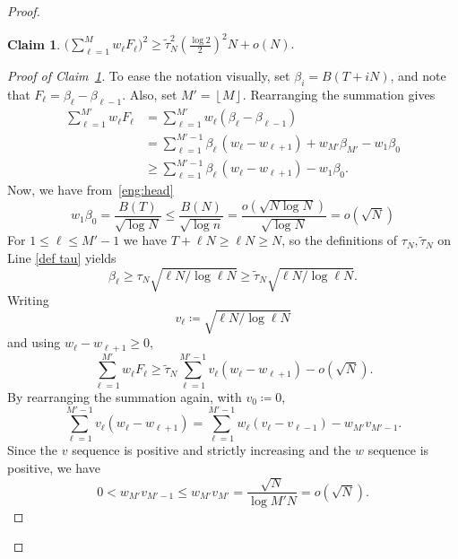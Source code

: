 \documentclass[10pt]{article}
\newcommand{\floor}[1]{\mbox{$\left\lfloor #1 \right\rfloor$}}
\newtheorem{claim}[thm]{Claim}
\begin{document}
\begin{proof}
\begin{claim}\label{eq:num}
    \(\displaystyle \bigg(\sum_{\ell=1}^{M}w_\ell F_\ell\bigg)^{2} \ge \widetilde{\tau}_N^2\left(\frac{\log 2}{2}\right)^2 N+ o(N).\)
\end{claim}
\begin{proof}[Proof of Claim~\ref{eq:num}]
To ease the notation visually, set $\beta_i=B(T+iN)$, and note that $F_\ell = \beta_\ell - \beta_{\ell-1}$. Also, set $M'=\floor{M}$. Rearranging the summation gives
\begin{align*}
   \sum_{\ell=1}^{M'}w_\ell F_\ell
   &=\sum_{\ell=1}^{M'}w_\ell(\beta_\ell-\beta_{\ell-1})\\
   &=\sum_{\ell=1}^{M'-1}\beta_\ell\,(w_\ell-w_{\ell+1})+w_{M'} \beta_{M'}-w_1\beta_0 \\
   &\ge\sum_{\ell=1}^{M'-1}\beta_\ell\,(w_\ell-w_{\ell+1})-w_1\beta_0.
\end{align*}
Now, we have from~\ref{eng:head}
    \[w_1\beta_0=\frac{B(T)}{\sqrt{\log N}}\le \frac{B(N)}{\sqrt{\log n}} = \frac{o(\sqrt{N \log N})}{\sqrt{\log N}} =o(\sqrt N)\]
For $1\le\ell\le M'-1$ we have 
$T+\ell N\ge\ell N\ge N$, so the definitions of $\tau_N,\widetilde{\tau}_N$ on Line \eqref{def tau} yields
  \[\beta_\ell\ge\tau_N \sqrt{\ell N/\log \ell N}  \ge \widetilde{\tau}_N \sqrt{\ell N/\log \ell N} .\] 
Writing 
    \[v_\ell\coloneqq \sqrt{\ell N/\log \ell N}\] 
and using $w_\ell-w_{\ell+1}\ge0$,
\[
   \sum_{\ell=1}^{M'}w_\ell F_\ell
   \ge\widetilde{\tau}_N\sum_{\ell=1}^{M'-1}v_\ell(w_\ell-w_{\ell+1})-o(\sqrt N) .
\]
By rearranging the summation again, with $v_0\coloneqq 0$,
\[
   \sum_{\ell=1}^{M'-1}v_\ell(w_\ell-w_{\ell+1})
   =\sum_{\ell=1}^{M'-1}w_\ell(v_\ell-v_{\ell-1})-w_{{M'}}v_{M' -1}.
\]
Since the $v$ sequence is positive and strictly increasing and the $w$ sequence is positive, we have
    \begin{equation*}
    0 < w_{M'}v_{M'-1} 
    \le w_{M'}v_{M'}
    = \frac{\sqrt{N}}{\log M'N} 
    =o(\sqrt N).
    \end{equation*}


\end{proof}
\end{proof}
\end{document}
